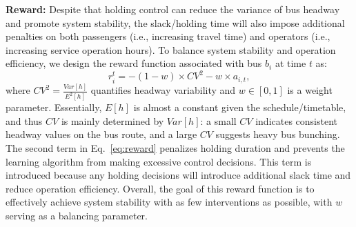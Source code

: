 \documentclass{article}
\begin{document}
\noindent\textbf{Reward:} Despite that holding control can reduce the variance of bus headway and  promote system stability, the slack/holding time will also impose additional penalties on both passengers (i.e., increasing travel time) and operators (i.e., increasing service operation hours). To balance system stability and operation efficiency, we design the reward function associated with bus $b_i$ at time $t$ as:
\begin{equation}
{r_i^t}= -(1-w)\times CV^2-w\times a_{i,t},
\label{eq:reward}
\end{equation}
where $CV^2=\frac{Var[h]}{E^2[h]}$ quantifies headway variability \cite{NAP24766} and $w\in \left[0,1\right]$ is a weight parameter. Essentially, $E[h]$ is almost a constant given the schedule/timetable, and thus $CV$ is mainly determined by $Var[h]$: a small $CV$ indicates consistent headway values on the bus route, and a large $CV$ suggests heavy bus bunching. The second term in Eq.~\eqref{eq:reward} penalizes holding duration and prevents the learning algorithm from making excessive control decisions. This term is introduced because any holding decisions will introduce additional slack time and reduce operation efficiency. Overall, the goal of this reward function is to effectively achieve system stability with as few interventions as possible, with $w$ serving as a balancing parameter. %
\end{document}
